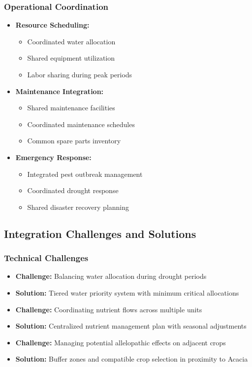 \subsubsection{Operational Coordination}
\begin{itemize}
    \item \textbf{Resource Scheduling:}
    \begin{itemize}
        \item Coordinated water allocation
        \item Shared equipment utilization
        \item Labor sharing during peak periods
    \end{itemize}
    \item \textbf{Maintenance Integration:}
    \begin{itemize}
        \item Shared maintenance facilities
        \item Coordinated maintenance schedules
        \item Common spare parts inventory
    \end{itemize}
    \item \textbf{Emergency Response:}
    \begin{itemize}
        \item Integrated pest outbreak management
        \item Coordinated drought response
        \item Shared disaster recovery planning
    \end{itemize}
\end{itemize}

\subsection{Integration Challenges and Solutions}

\subsubsection{Technical Challenges}
\begin{itemize}
    \item \textbf{Challenge:} Balancing water allocation during drought periods
    \item \textbf{Solution:} Tiered water priority system with minimum critical allocations
    
    \item \textbf{Challenge:} Coordinating nutrient flows across multiple units
    \item \textbf{Solution:} Centralized nutrient management plan with seasonal adjustments
    
    \item \textbf{Challenge:} Managing potential allelopathic effects on adjacent crops
    \item \textbf{Solution:} Buffer zones and compatible crop selection in proximity to Acacia
\end{itemize}

